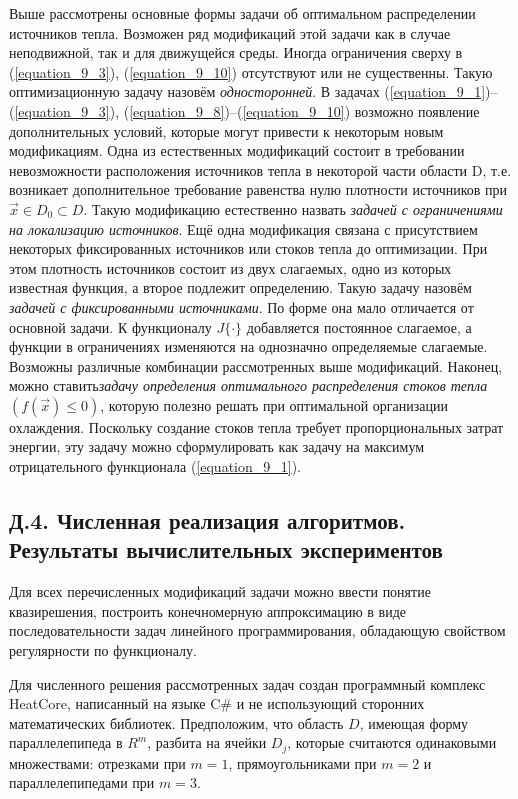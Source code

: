 Выше рассмотрены основные формы задачи об оптимальном распределении источников тепла. Возможен ряд модификаций этой задачи как в случае неподвижной, так и для движущейся среды. Иногда ограничения сверху в (\ref{equation_9_3}), (\ref{equation_9_10}) отсутствуют или не существенны. Такую оптимизационную задачу назовём \textit{односторонней}. В задачах (\ref{equation_9_1})--(\ref{equation_9_3}), (\ref{equation_9_8})--(\ref{equation_9_10}) возможно появление дополнительных условий, которые могут привести к некоторым новым модификациям. Одна из естественных модификаций состоит в требовании невозможности расположения источников тепла в некоторой части области D, т.е. возникает дополнительное требование равенства нулю плотности источников при $\vec x{\in}D_0{\subset}D$. Такую модификацию естественно назвать \textit{задачей с ограничениями на локализацию источников}. Ещё одна модификация связана с присутствием некоторых фиксированных источников или стоков тепла до оптимизации. При этом плотность источников состоит из двух слагаемых, одно из которых известная функция, а второе подлежит определению. Такую задачу назовём \textit{задачей с фиксированными источниками}. По форме она мало отличается от основной задачи. К функционалу $J\{\cdot\}$ добавляется постоянное слагаемое, а функции в ограничениях изменяются на однозначно определяемые слагаемые. Возможны различные комбинации рассмотренных выше модификаций. Наконец, можно ставить\textit{задачу определения оптимального распределения стоков тепла} $\left(f(\vec{x}){\le}0\right)$, которую полезно решать при оптимальной организации охлаждения. Поскольку создание стоков тепла требует пропорциональных затрат энергии, эту задачу можно сформулировать как задачу на максимум отрицательного функционала (\ref{equation_9_1}).

\subsection*{ \center Д.4. Численная реализация алгоритмов. Результаты вычислительных экспериментов}

Для всех перечисленных модификаций задачи можно ввести понятие квазирешения, построить конечномерную аппроксимацию в виде последовательности задач линейного программирования, обладающую свойством регулярности по функционалу.

Для численного решения рассмотренных задач создан программный комплекс HeatCore, написанный на языке C\# и не использующий сторонних математических библиотек. Предположим, что область $D$, имеющая форму параллелепипеда в $R^m$, разбита на ячейки $D_j$, которые считаются одинаковыми множествами: отрезками при $m{=}1$, прямоугольниками при $m{=}2$ и параллелепипедами при $m{=}3$.







